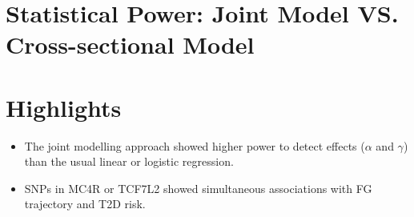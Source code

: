 \documentclass[10pt,a0,portrait]{a0poster}
\begin{document}
\begin{multicols}{2}
\section*{Statistical Power: \large{Joint Model VS. Cross-sectional Model}}
\begin{center}
    \large{}
    \label{Tab2}
\end{center}



\section*{Highlights}
\vspace{-1cm}
\begin{itemize}
\item The \textcolor{maroon2}{joint modelling} approach showed \textcolor{maroon2}{higher power} to detect effects (\textcolor{springgreen3}{$\alpha$} and \textcolor{springgreen3}{$\gamma$}) than the usual linear or logistic regression.
\item SNPs in \textcolor{maroon2}{MC4R} or \textcolor{maroon2}{TCF7L2} showed \textcolor{maroon2}{simultaneous associations} with FG trajectory and T2D risk.
\end{itemize}


\end{multicols}
\color{SaddleBrown}
\normalsize
\end{document}
